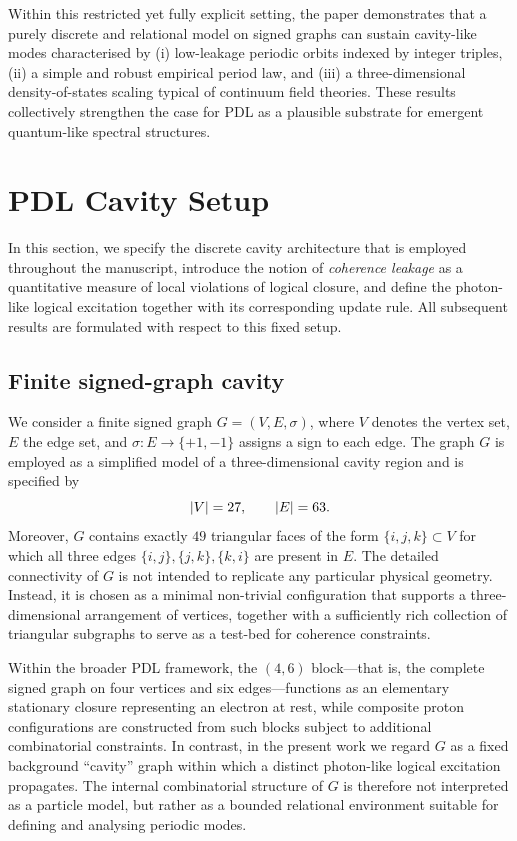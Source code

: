 \documentclass{article}
\theoremstyle{definition}
\begin{document}
Within this restricted yet fully explicit setting, the paper demonstrates that a purely discrete and relational model on signed graphs can sustain cavity-like modes characterised by (i) low-leakage periodic orbits indexed by integer triples, (ii) a simple and robust empirical period law, and (iii) a three-dimensional density-of-states scaling typical of continuum field theories. These results collectively strengthen the case for PDL as a plausible substrate for emergent quantum-like spectral structures.\cite{PDL_Main_2026,PDL_Position_2026}

\section{PDL Cavity Setup}\label{sec:PDL_cavity_setup}

In this section, we specify the discrete cavity architecture that is employed throughout the manuscript, introduce the notion of \emph{coherence leakage} as a quantitative measure of local violations of logical closure, and define the photon-like logical excitation together with its corresponding update rule. All subsequent results are formulated with respect to this fixed setup.

\subsection{Finite signed-graph cavity}

We consider a finite signed graph $G = (V,E,\sigma)$, where $V$ denotes the vertex set, $E$ the edge set, and $\sigma : E \to \{+1,-1\}$ assigns a sign to each edge.\cite{PDL_Main_2026} The graph $G$ is employed as a simplified model of a three-dimensional cavity region and is specified by
\[
\abs{V} = 27,\qquad \abs{E} = 63.
\]
Moreover, $G$ contains exactly $49$ triangular faces of the form $\{i,j,k\} \subset V$ for which all three edges $\{i,j\},\{j,k\},\{k,i\}$ are present in $E$.\cite{Effective_Fields_PDL_2026} The detailed connectivity of $G$ is not intended to replicate any particular physical geometry. Instead, it is chosen as a minimal non-trivial configuration that supports a three-dimensional arrangement of vertices, together with a sufficiently rich collection of triangular subgraphs to serve as a test-bed for coherence constraints.

Within the broader PDL framework, the $(4,6)$ block—that is, the complete signed graph on four vertices and six edges—functions as an elementary stationary closure representing an electron at rest, while composite proton configurations are constructed from such blocks subject to additional combinatorial constraints.\cite{PDL_Main_2026,Combinatorial_Proton_v2_2026} In contrast, in the present work we regard $G$ as a fixed background “cavity” graph within which a distinct photon-like logical excitation propagates. The internal combinatorial structure of $G$ is therefore not interpreted as a particle model, but rather as a bounded relational environment suitable for defining and analysing periodic modes.
\end{document}
